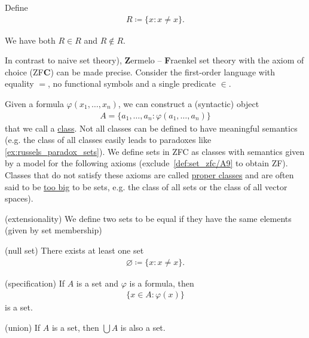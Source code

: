 \begin{example}\label{ex:russels_paradox_sets}
  Define
  \begin{align*}
    R \coloneqq \{ x \colon x \neq x \}.
  \end{align*}

  We have both $R \in R$ and $R \not\in R$.
\end{example}

\begin{definition}\label{def:set_zfc}\cite[3]{Lectures:general_topology}
  In contrast to naive set theory), \textbf{Z}ermelo – \textbf{F}raenkel set theory with the axiom of choice (ZF\textbf{C}) can be made precise. Consider the first-order language with equality $=$, no functional symbols and a single predicate $\in$.

  Given a formula $\varphi(x_1, \ldots, x_n)$, we can construct a (syntactic) object
  \begin{align*}
    A = \{ a_1, \ldots, a_n \colon \varphi(a_1, \ldots, a_n) \}
  \end{align*}
  that we call a \uline{class}. Not all classes can be defined to have meaningful semantics (e.g. the class of all classes easily leads to paradoxes like \cref{ex:russels_paradox_sets}). We define sets in ZFC as classes with semantics given by a model for the following axioms (exclude~\ref{def:set_zfc/A9} to obtain ZF). Classes that do not satisfy these axioms are called \uline{proper classes} and are often said to be \uline{too big} to be sets, e.g. the class of all sets or the class of all vector spaces).

  \begin{description}
    (extensionality) We define two sets to be equal if they have the same elements (given by set membership)

    (null set) There exists at least one set
    \begin{align*}
      \varnothing \coloneqq \{ x \colon x \neq x \}.
    \end{align*}

    (specification) If $A$ is a set and $\varphi$ is a formula, then
    \begin{align*}
      \{ x \in A \colon \varphi(x) \}
    \end{align*}
    is a set.

    (union) If $A$ is a set, then $\bigcup A$ is also a set.


\end{description}
\end{definition}
